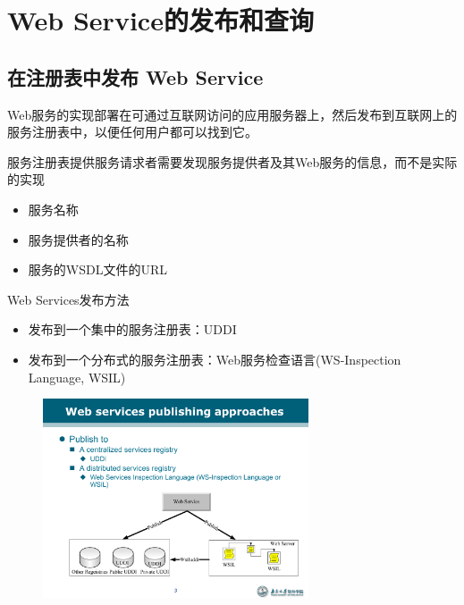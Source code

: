 \section{Web Service的发布和查询}

\subsection{在注册表中发布 Web Service}
Web服务的实现部署在可通过互联网访问的应用服务器上，然后发布到互联网上的服务注册表中，以便任何用户都可以找到它。

服务注册表提供服务请求者需要发现服务提供者及其Web服务的信息，而不是实际的实现
\vspace{-0.8em}
\begin{multicols}{3}
    \begin{itemize}
        \item 服务名称
        \item 服务提供者的名称
        \item 服务的WSDL文件的URL
    \end{itemize}
\end{multicols}
\vspace{-1em}

Web Services发布方法
\begin{itemize}
    \item 发布到一个集中的服务注册表：UDDI
    \item 发布到一个分布式的服务注册表：Web服务检查语言(WS-Inspection Language, WSIL)
\end{itemize}

\begin{figure}[H]
    \vspace{-0.5em}
	\centering
	\includegraphics[width=0.7\textwidth]{images/Web services publishing approaches.pdf}
    \vspace{-1em}
\end{figure}

